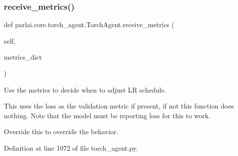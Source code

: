 \subsubsection{\texorpdfstring{receive\+\_\+metrics()}{receive\_metrics()}}
{\footnotesize\ttfamily def parlai.\+core.\+torch\+\_\+agent.\+Torch\+Agent.\+receive\+\_\+metrics (\begin{DoxyParamCaption}\item[{}]{self,  }\item[{}]{metrics\+\_\+dict }\end{DoxyParamCaption})}

\begin{DoxyVerb}Use the metrics to decide when to adjust LR schedule.

This uses the loss as the validation metric if present, if not this
function does nothing. Note that the model must be reporting loss for
this to work.

Override this to override the behavior.
\end{DoxyVerb}
 

Definition at line 1072 of file torch\+\_\+agent.\+py.


